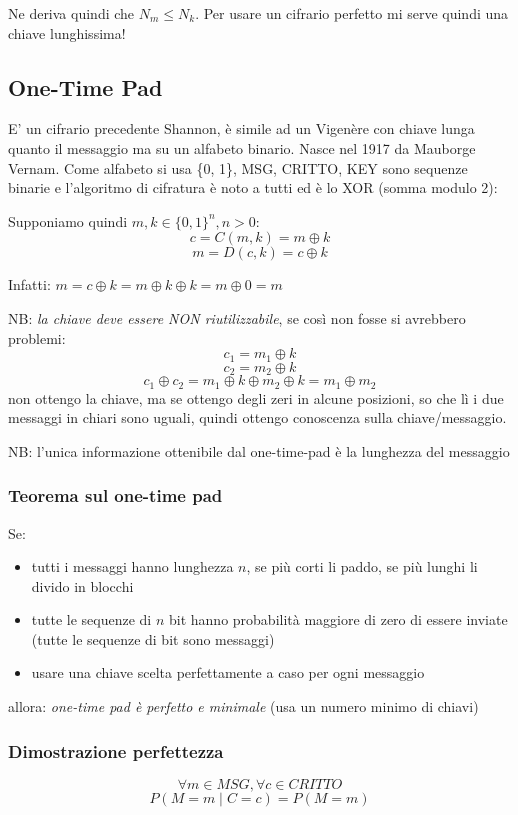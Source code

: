Ne deriva quindi che $N_m \leq N_k$. Per usare un cifrario perfetto mi serve quindi una chiave lunghissima!

\subsection{One-Time Pad}
E' un cifrario precedente Shannon, è simile ad un Vigenère con chiave lunga quanto il messaggio ma su un alfabeto binario. Nasce nel 1917 da Mauborge Vernam. Come alfabeto si usa \{0, 1\}, MSG, CRITTO, KEY sono sequenze binarie e l'algoritmo di cifratura è noto a tutti ed è lo XOR (somma modulo 2):

Supponiamo quindi $m, k \in \{0, 1\}^{n}, n > 0$:
$$ c = C(m, k) = m \oplus k $$
$$ m = D(c, k) = c \oplus k$$

Infatti: $m = c \oplus k = m \oplus k \oplus k = m \oplus 0 = m$

NB: \emph{la chiave deve essere NON riutilizzabile}, se così non fosse si avrebbero problemi:
$$ c_1 = m_1 \oplus k $$
$$ c_2 = m_2 \oplus k $$
$$ c_1 \oplus c_2 = m_1 \oplus k \oplus m_2 \oplus k = m_1 \oplus m_2 $$
non ottengo la chiave, ma se ottengo degli zeri in alcune posizioni, so che lì i due messaggi in chiari sono uguali, quindi ottengo conoscenza sulla chiave/messaggio.

NB: l'unica informazione ottenibile dal one-time-pad è la lunghezza del messaggio

\subsubsection{Teorema sul one-time pad}
Se:
\begin{itemize}
    \item tutti i messaggi hanno lunghezza $n$, se più corti li paddo, se più lunghi li divido in blocchi
    \item tutte le sequenze di $n$ bit hanno probabilità maggiore di zero di essere inviate (tutte le sequenze di bit sono messaggi)
    \item usare una chiave scelta perfettamente a caso per ogni messaggio
\end{itemize}
allora: \emph{one-time pad è perfetto e minimale} (usa un numero minimo di chiavi)

\subsubsection{Dimostrazione perfettezza}
$$ \forall m \in MSG, \forall c \in CRITTO $$
$$ P(M=m \mid C=c) = P(M=m) $$

